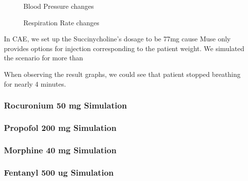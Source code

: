 \documentclass[a4paper]{article}
\begin{document}
\begin{figure}[!htb]\centering
   \begin{minipage}{0.49\textwidth}
     \caption{Blood Pressure changes}
     \label{fig:given 5 mg Succinylcholine}
     
   \end{minipage}
   \begin {minipage}{0.49\textwidth}
     \caption{Respiration Rate changes}
     \label{fig:given 5 mg Succinylcholine}
   \end{minipage}
\end{figure}

In CAE, we set up the Succinycholine's dosage to be 77mg cause Muse only provides options for injection corresponding to the patient weight. We simulated the scenario for more than 

When observing the result graphs, we could see that patient stopped breathing for nearly 4 minutes. 




\subsubsection{Rocuronium 50 mg Simulation}

\subsubsection{Propofol 200 mg Simulation}

\subsubsection{Morphine 40 mg Simulation}

\subsubsection{Fentanyl 500 ug Simulation}
\end{document}
